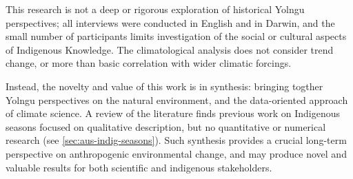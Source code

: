 This research is not a deep or rigorous exploration of historical Yolngu
perspectives; all interviews were conducted in English and in Darwin, and
the small number of participants limits investigation of the social or
cultural aspects of Indigenous Knowledge.  The climatological analysis
does not consider trend change, or more than basic correlation with
wider climatic forcings.

Instead, the novelty and value of this work is in synthesis: bringing
togther Yolngu perspectives on the natural environment, and the
data-oriented approach of climate science.  A review of the literature
finds previous work on Indigenous seasons focused on qualitative description, but
no quantitative or numerical research (see \cref{sec:aus-indig-seasons}).
Such synthesis provides a crucial long-term perspective on
anthropogenic environmental change, and may produce novel and valuable
results for both scientific and indigenous stakeholders.

